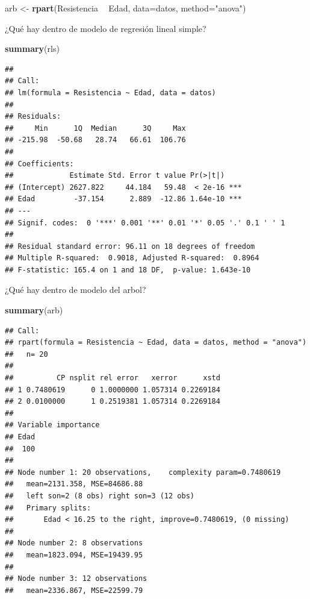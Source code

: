 \documentclass[]{book}
\makeatletter
\newenvironment{Shaded}{\begin{snugshade}}{\end{snugshade}}
\newcommand{\DataTypeTok}[1]{\textcolor[rgb]{0.13,0.29,0.53}{#1}}
\newcommand{\KeywordTok}[1]{\textcolor[rgb]{0.13,0.29,0.53}{\textbf{#1}}}
\newcommand{\NormalTok}[1]{#1}
\newcommand{\OperatorTok}[1]{\textcolor[rgb]{0.81,0.36,0.00}{\textbf{#1}}}
\newcommand{\StringTok}[1]{\textcolor[rgb]{0.31,0.60,0.02}{#1}}
\newenvironment{kframe}{%
\medskip{}
\setlength{\fboxsep}{.8em}
 \def\at@end@of@kframe{}%
 \ifinner\ifhmode%
  \def\at@end@of@kframe{\end{minipage}}%
  \begin{minipage}{\columnwidth}%
 \fi\fi%
 \def\FrameCommand##1{\hskip\@totalleftmargin \hskip-\fboxsep
 \colorbox{shadecolor}{##1}\hskip-\fboxsep
     \hskip-\linewidth \hskip-\@totalleftmargin \hskip\columnwidth}%
 \MakeFramed {\advance\hsize-\width
   \@totalleftmargin\z@ \linewidth\hsize
   \@setminipage}}%
 {\par\unskip\endMakeFramed%
 \at@end@of@kframe}
\renewenvironment{Shaded}{\begin{kframe}}{\end{kframe}}
\makeatother
\begin{document}
\begin{Shaded}
\begin{Highlighting}[]
\NormalTok{arb <-}\StringTok{ }\KeywordTok{rpart}\NormalTok{(Resistencia }\OperatorTok{~}\StringTok{ }\NormalTok{Edad, }\DataTypeTok{data=}\NormalTok{datos, }\DataTypeTok{method=}\StringTok{"anova"}\NormalTok{)}
\end{Highlighting}
\end{Shaded}

¿Qué hay dentro de modelo de regresión lineal simple?

\begin{Shaded}
\begin{Highlighting}[]
\KeywordTok{summary}\NormalTok{(rls)}
\end{Highlighting}
\end{Shaded}

\begin{verbatim}
## 
## Call:
## lm(formula = Resistencia ~ Edad, data = datos)
## 
## Residuals:
##     Min      1Q  Median      3Q     Max 
## -215.98  -50.68   28.74   66.61  106.76 
## 
## Coefficients:
##             Estimate Std. Error t value Pr(>|t|)    
## (Intercept) 2627.822     44.184   59.48  < 2e-16 ***
## Edad         -37.154      2.889  -12.86 1.64e-10 ***
## ---
## Signif. codes:  0 '***' 0.001 '**' 0.01 '*' 0.05 '.' 0.1 ' ' 1
## 
## Residual standard error: 96.11 on 18 degrees of freedom
## Multiple R-squared:  0.9018, Adjusted R-squared:  0.8964 
## F-statistic: 165.4 on 1 and 18 DF,  p-value: 1.643e-10
\end{verbatim}

¿Qué hay dentro de modelo del arbol?

\begin{Shaded}
\begin{Highlighting}[]
\KeywordTok{summary}\NormalTok{(arb)}
\end{Highlighting}
\end{Shaded}

\begin{verbatim}
## Call:
## rpart(formula = Resistencia ~ Edad, data = datos, method = "anova")
##   n= 20 
## 
##          CP nsplit rel error   xerror      xstd
## 1 0.7480619      0 1.0000000 1.057314 0.2269184
## 2 0.0100000      1 0.2519381 1.057314 0.2269184
## 
## Variable importance
## Edad 
##  100 
## 
## Node number 1: 20 observations,    complexity param=0.7480619
##   mean=2131.358, MSE=84686.88 
##   left son=2 (8 obs) right son=3 (12 obs)
##   Primary splits:
##       Edad < 16.25 to the right, improve=0.7480619, (0 missing)
## 
## Node number 2: 8 observations
##   mean=1823.094, MSE=19439.95 
## 
## Node number 3: 12 observations
##   mean=2336.867, MSE=22599.79
\end{verbatim}
\end{document}
